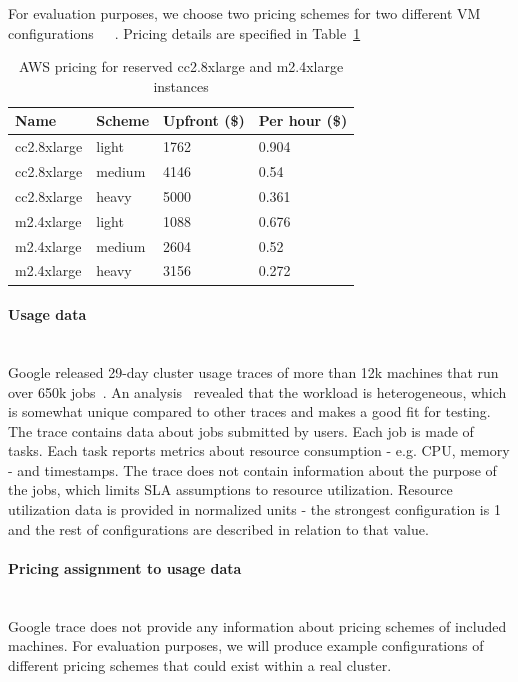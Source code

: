 \documentclass[]{final_report}
\newcommand{\myparagraph}[1]{\paragraph{#1}\mbox{}\\}
\begin{document}
For evaluation purposes, we choose two pricing schemes for two different VM configurations~\cite{AWS:light}~\cite{AWS:medium}~\cite{AWS:heavy}. Pricing details are specified in Table~\ref{tab:aws_pricing}

\begin{table}[h]
\begin{center}
    \begin{tabular}{| l | l | l | l |}
    \hline
    \textbf{Name} & \textbf{Scheme} & \textbf{Upfront (\$)} & \textbf{Per hour (\$)} \\
    \hline
    cc2.8xlarge & light & 1762 & 0.904 \\
    \hline
    cc2.8xlarge & medium & 4146 & 0.54 \\
    \hline
    cc2.8xlarge & heavy & 5000 & 0.361 \\
    \hline
    m2.4xlarge & light & 1088 & 0.676 \\
    \hline
    m2.4xlarge & medium & 2604 & 0.52 \\
    \hline
    m2.4xlarge & heavy & 3156 & 0.272 \\
    \hline
    \end{tabular}
\end{center}
\caption{AWS pricing for reserved cc2.8xlarge and m2.4xlarge instances}
\label{tab:aws_pricing}
\end{table}

\myparagraph{Usage data}

Google released 29-day cluster usage traces of more than 12k machines that run over 650k jobs~\cite{clusterdata:Reiss2011}. An analysis~\cite{clusterdata:Reiss2012b} revealed that the workload is heterogeneous, which is somewhat unique compared to other traces and makes a good fit for testing.
The trace contains data about jobs submitted by users. Each job is made of tasks. Each task reports metrics about resource consumption - e.g. CPU, memory - and timestamps. The trace does not contain information about the purpose of the jobs, which limits SLA assumptions to resource utilization. 
Resource utilization data is provided in normalized units - the strongest configuration is 1 and the rest of configurations are described in relation to that value.

\myparagraph{Pricing assignment to usage data}

Google trace does not provide any information about pricing schemes of included machines. For evaluation purposes, we will produce example configurations of different pricing schemes that could exist within a real cluster. 
\end{document}
